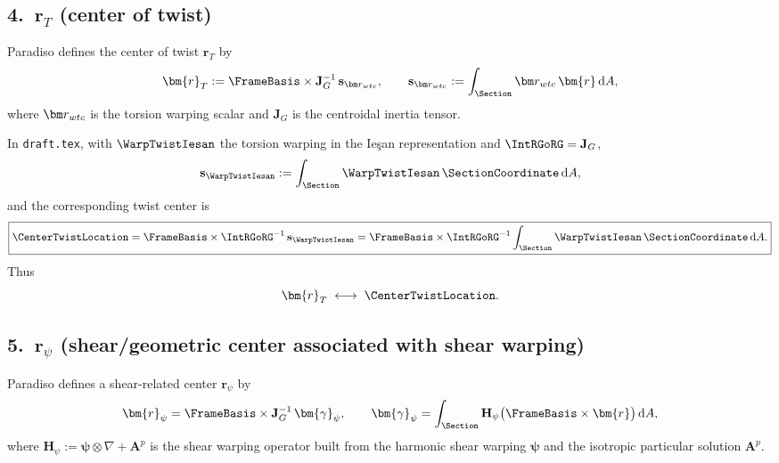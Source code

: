 \subsection*{4.\ $\bm{r}_T$ (center of twist)}

Paradiso defines the center of twist $\bm{r}_T$ by
\begin{equation}
  \bm{r}_T := \FrameBasis\times\mathbf{J}_G^{-1}\,\mathbf{s}_{\WarpTwistCentroid},
  \qquad
  \mathbf{s}_{\WarpTwistCentroid} := \int_\Section \WarpTwistCentroid\,\bm{r}\,\mathrm{d}A,
\end{equation}
where $\WarpTwistCentroid$ is the torsion warping scalar and $\mathbf{J}_G$ is the centroidal inertia tensor.

In \texttt{draft.tex}, with $\WarpTwistIesan$ the torsion warping in the Ieşan representation and $\IntRGoRG = \mathbf{J}_G$,
\begin{equation}
  \mathbf{s}_{\WarpTwistIesan} := \int_\Section \WarpTwistIesan\,\SectionCoordinate\,\mathrm{d}A,
\end{equation}
and the corresponding twist center is
\begin{equation}
  \boxed{
  \CenterTwistLocation
  = \FrameBasis\times\IntRGoRG^{-1}\,\mathbf{s}_{\WarpTwistIesan}
  = \FrameBasis\times\IntRGoRG^{-1}
    \int_\Section \WarpTwistIesan\,\SectionCoordinate\,\mathrm{d}A.}
\end{equation}
Thus
\begin{equation}
  \bm{r}_T \;\longleftrightarrow\; \CenterTwistLocation.
\end{equation}

\subsection*{5.\ $\bm{r}_\psi$ (shear/geometric center associated with shear warping)}

Paradiso defines a shear-related center $\bm{r}_\psi$ by
\begin{equation}
  \bm{r}_\psi
  = \FrameBasis\times\mathbf{J}_G^{-1}\,\bm{\gamma}_\psi,
  \qquad
  \bm{\gamma}_\psi
  = \int_\Section \mathbf{H}_\psi\bigl(\FrameBasis\times\bm{r}\bigr)\,\mathrm{d}A,
\end{equation}
where $\mathbf{H}_\psi := \bm{\psi}\otimes\nabla + \mathbf{A}^p$ is the shear warping operator built from the harmonic shear warping $\bm{\psi}$ and the isotropic particular solution $\mathbf{A}^p$.

